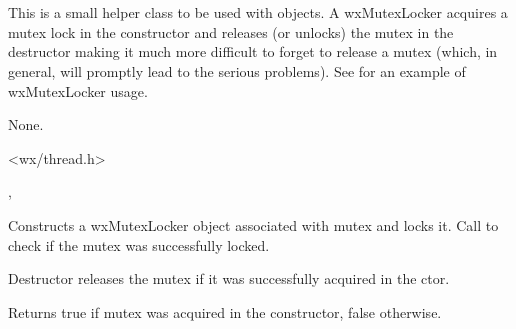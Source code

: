 \section{}\label{wxmutexlocker}

This is a small helper class to be used with  
objects. A wxMutexLocker acquires a mutex lock in the constructor and releases
(or unlocks) the mutex in the destructor making it much more difficult to
forget to release a mutex (which, in general, will promptly lead to the serious
problems). See  for an example of wxMutexLocker
usage.


None.


<wx/thread.h>


, 


\label{wxmutexlockerctor}


Constructs a wxMutexLocker object associated with mutex and locks it.
Call  to check if the mutex was
successfully locked.

\label{wxmutexlockerdtor}


Destructor releases the mutex if it was successfully acquired in the ctor.

\label{wxmutexlockerisok}


Returns true if mutex was acquired in the constructor, false otherwise.

